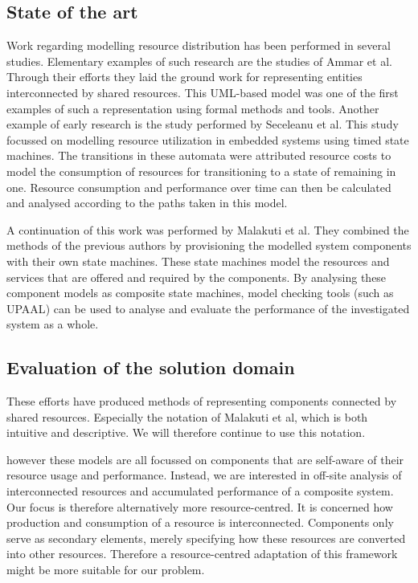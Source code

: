 \subsection{State of the art}
Work regarding modelling resource distribution has been performed in several studies. Elementary examples of such research are the studies of Ammar et al\cite{rum_basis_2}. Through their efforts they laid the ground work for representing entities interconnected by shared resources. This UML-based model was one of the first examples of such a representation using formal methods and tools. Another example of early research is the study performed by Seceleanu et al\cite{rum_basis_89}. This study focussed on modelling resource utilization in embedded systems using timed state machines. The transitions in these automata were attributed resource costs to model the consumption of resources for transitioning to a state of remaining in one. Resource consumption and performance over time  can then be calculated and analysed according to the paths taken in this model.

A continuation of this work was performed by Malakuti et al\cite{steven-te-brinke}. They combined the methods of the previous authors by provisioning the modelled system components with their own state machines. These state machines model the resources and services that are offered and required by the components. By analysing these component models as composite state machines, model checking tools (such as UPAAL\cite{web:upaal}) can be used to analyse and evaluate the performance of the investigated system as a whole.

\subsection{Evaluation of the solution domain}
These efforts have produced methods of representing components connected by shared resources. Especially the notation of Malakuti et al\cite{steven-te-brinke}, which is both intuitive and descriptive. We will therefore continue to use this notation.

however these models are all focussed on components that are self-aware of their resource usage and performance. Instead, we are interested in off-site analysis of interconnected resources and accumulated performance of a composite system. Our focus is therefore alternatively more resource-centred. It is concerned how production and consumption of a resource is interconnected. Components only serve as secondary elements, merely specifying how these resources are converted into other resources. Therefore a resource-centred adaptation of this framework might be more suitable for our problem.

